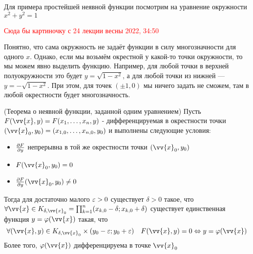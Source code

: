 \begin{example}
	Для примера простейшей неявной функции посмотрим на уравнение окружности $x^2 + y^2 = 1$
	
	\textcolor{red}{Сюда бы картиночку с 24 лекции весны 2022, 34:50}
	
	Понятно, что сама окружность не задаёт функции в силу многозначности для одного $x$. Однако, если мы возьмём окрестной у какой-то точки окружности, то мы можем явно выделить функцию. Например, для любой точки в верхней полуокружности это будет $y = \sqrt{1 - x^2}$, а для любой точки из нижней --- $y = -\sqrt{1 - x^2}$. При этом, для точек $(\pm 1, 0)$ мы ничего задать не сможем, там в любой окрестности будет многозначность.
\end{example}

\begin{theorem} (Теорема о неявной функции, заданной одним уравнением)
	Пусть $F(\vv{x}, y) = F(x_1, \ldots, x_n, y)$ - дифференцируемая в окрестности точки $(\vv{x}_0, y_0) = (x_{1, 0}, \ldots, x_{n, 0}, y_0)$ и выполнены следующие условия:
	\begin{itemize}
		\item $\frac{\partial F}{\partial y}$ непрерывна в той же окрестности точки $(\vv{x}_0, y_0)$
		
		\item $F(\vv{x}_0, y_0) = 0$
		
		\item $\pd{F}{y}(\vv{x}_0, y_0) \neq 0$
	\end{itemize}
	Тогда для достаточно малого $\varepsilon > 0$ существует $\delta > 0$ такое, что $\forall \vv{x} \in K_{\delta, \vv{x}_0} = \prod_{k = 1}^n (x_{k, 0} - \delta; x_{k, 0} + \delta)$ существует единственная функция $y = \phi(\vv{x})$ такая, что
	\[
		\forall (\vv{x}, y) \in K_{\delta, \vv{x}_0} \times (y_0 - \eps; y_0 + \eps) \quad F(\vv{x}, y) = 0 \lra y = \phi(\vv{x})
	\]
	Более того, $\phi(\vv{x})$ дифференцируема в точке $\vv{x}_0$
\end{theorem}

